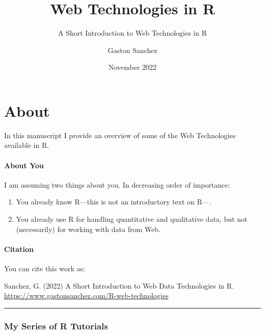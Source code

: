 \documentclass[
]{book}
\title{Web Technologies in R}
\subtitle{A Short Introduction to Web Technologies in R}
\author{Gaston Sanchez}
\date{November 2022}
\begin{document}
\maketitle

{
\setcounter{tocdepth}{1}
\tableofcontents
}
\hypertarget{about}{%
\chapter*{About}\label{about}}

In this manuscript I provide an overview of some of the Web Technologies
available in R.

\hypertarget{about-you}{%
\subsubsection*{About You}\label{about-you}}

I am assuming two things about you. In decreasing order of importance:

\begin{enumerate}
\def\labelenumi{\arabic{enumi})}
\item
  You already know R---this is not an introductory text on R---.
\item
  You already use R for handling quantitative and qualitative data, but not
  (necessarily) for working with data from Web.
\end{enumerate}

\hypertarget{citation}{%
\subsubsection*{Citation}\label{citation}}

You can cite this work as:

Sanchez, G. (2022) A Short Introduction to Web Data Technologies in R.
\url{https://www.gastonsanchez.com/R-web-technologies}

\begin{center}\rule{0.5\linewidth}{0.5pt}\end{center}

\hypertarget{my-series-of-r-tutorials}{%
\subsection*{My Series of R Tutorials}\label{my-series-of-r-tutorials}}
\end{document}
